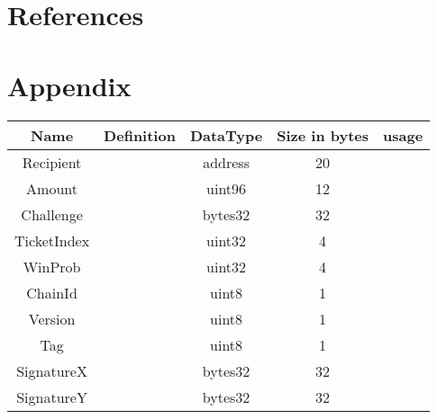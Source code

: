 \section{References}

\section{Appendix}
\vspace{1cm}
    \begin{tabular}{ c | c | c | c | c}
    Name & Definition & DataType & Size in bytes & usage\\ \hline
    Recipient & &address & 20 & \\  
    Amount & &uint96 & 12 &  \\
    Challenge & &bytes32 & 32 & \\
    TicketIndex & &uint32 & 4 & \\
    WinProb & &uint32 & 4 & \\
    ChainId & &uint8 & 1 & \\
    Version & &uint8 & 1 & \\
    Tag & &uint8 & 1 & \\
    SignatureX & &bytes32 & 32 & \\
    SignatureY & &bytes32 & 32 & 
    \end{tabular}



